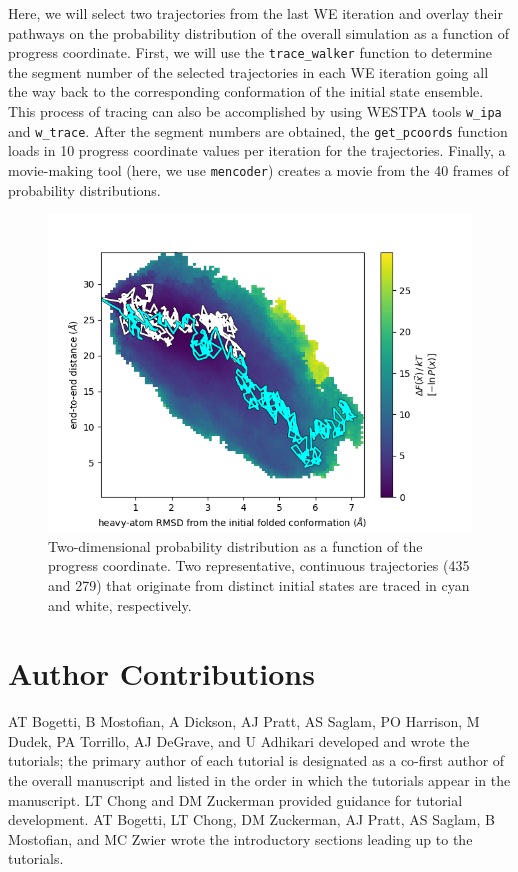 \documentclass[9pt,tutorial]{livecoms}
\begin{document}
Here, we will select two trajectories from the last WE iteration and overlay their pathways on the probability distribution of the overall simulation as a function of progress coordinate. 
First, we will use the \verb|trace_walker| function to determine the segment number of the selected trajectories in each WE iteration going all the way back to the corresponding conformation of the initial state ensemble. 
This process of tracing can also be accomplished by using WESTPA tools \verb|w_ipa| and \verb|w_trace|. 
After the segment numbers are obtained, the \verb|get_pcoords| function loads in 10 progress coordinate values per iteration for the trajectories. 
Finally, a movie-making tool (here, we use \verb|mencoder|) creates a movie from the 40 frames of probability distributions. 

\begin{figure}
\includegraphics[width=\linewidth]{Figure13.png}
\caption{Two-dimensional probability distribution as a function of the progress coordinate. 
Two representative, continuous trajectories (435 and 279) that originate from distinct initial states are traced in cyan and white, respectively.}
\label{fig:view}
\end{figure}

\section{Author Contributions}

AT Bogetti, B Mostofian, A Dickson, AJ Pratt, AS Saglam, PO Harrison, M Dudek, PA Torrillo, AJ DeGrave, and U Adhikari developed and wrote the tutorials; the primary author of each tutorial is designated as a co-first author of the overall manuscript and listed in the order in which the tutorials appear in the manuscript. LT Chong and DM Zuckerman provided guidance for tutorial development. 
AT Bogetti, LT Chong, DM Zuckerman, AJ Pratt, AS Saglam, B Mostofian, and MC Zwier wrote the introductory sections leading up to the tutorials. 
\end{document}
